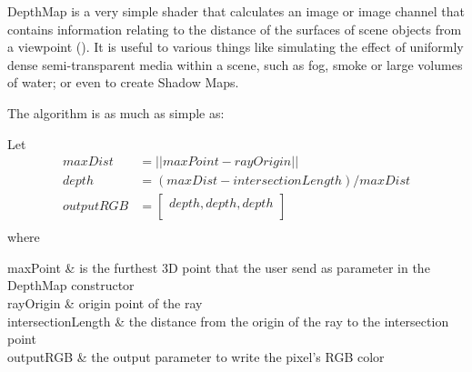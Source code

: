 \par
DepthMap is a very simple shader that calculates an image or image channel that contains information relating to the distance of the surfaces of scene objects from a viewpoint (\cite{DepthMap}).
It is useful to various things like simulating the effect of uniformly dense semi-transparent media within a scene, such as fog, smoke or large volumes of water; or even to create Shadow Maps.

The algorithm is as much as simple as:




Let
\begin{equation}
\label{DepthMapAlgorithm}
\begin{aligned}
maxDist & = ||maxPoint - rayOrigin|| \\
depth & = (maxDist - intersectionLength) / maxDist \\
outputRGB & = \begin{bmatrix}
depth, depth, depth\\
\end{bmatrix} \\
\end{aligned}
\end{equation}
where
\begin{conditions*}
	maxPoint & is the furthest 3D point that the user send as parameter in the DepthMap constructor \\
	rayOrigin & origin point of the ray \\
	intersectionLength & the distance from the origin of the ray to the intersection point  \\
	outputRGB & the output parameter to write the pixel's RGB color \\
\end{conditions*}

